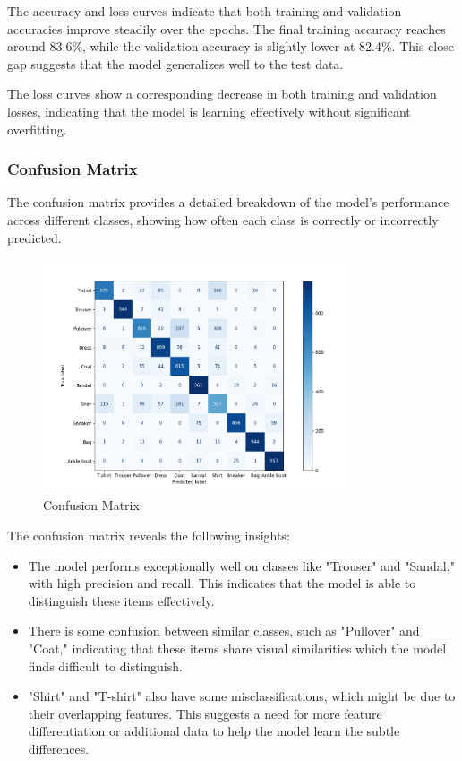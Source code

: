 \documentclass[a4paper,10pt]{article}
\begin{document}
The accuracy and loss curves indicate that both training and validation accuracies improve steadily over the epochs. The final training accuracy reaches around 83.6\%, while the validation accuracy is slightly lower at 82.4\%. This close gap suggests that the model generalizes well to the test data.

The loss curves show a corresponding decrease in both training and validation losses, indicating that the model is learning effectively without significant overfitting.

\subsubsection{Confusion Matrix}
The confusion matrix provides a detailed breakdown of the model's performance across different classes, showing how often each class is correctly or incorrectly predicted.

\begin{figure}[h]
\centering
\includegraphics[width=0.8\textwidth]{3.png}
\caption{Confusion Matrix}
\end{figure}

The confusion matrix reveals the following insights:
\begin{itemize}
    \item The model performs exceptionally well on classes like "Trouser" and "Sandal," with high precision and recall. This indicates that the model is able to distinguish these items effectively.
    \item There is some confusion between similar classes, such as "Pullover" and "Coat," indicating that these items share visual similarities which the model finds difficult to distinguish.
    \item "Shirt" and "T-shirt" also have some misclassifications, which might be due to their overlapping features. This suggests a need for more feature differentiation or additional data to help the model learn the subtle differences.
\end{itemize}
\end{document}
